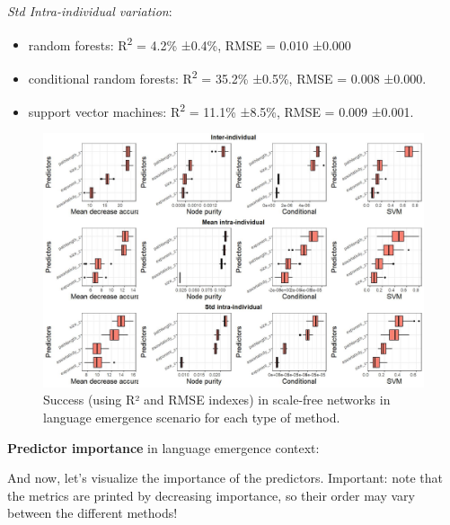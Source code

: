 \documentclass[
]{article}
\providecommand{\tightlist}{%
  \setlength{\itemsep}{0pt}\setlength{\parskip}{0pt}}
\begin{document}
\emph{Std Intra-individual variation}:

\begin{itemize}
\tightlist
\item
  random forests: R\textsuperscript{2} = 4.2\% ±0.4\%, RMSE = 0.010
  ±0.000
\item
  conditional random forests: R\textsuperscript{2} = 35.2\% ±0.5\%, RMSE
  = 0.008 ±0.000.
\item
  support vector machines: R\textsuperscript{2} = 11.1\% ±8.5\%, RMSE =
  0.009 ±0.001.
\end{itemize}

\begin{figure}[!H]

{\centering \includegraphics{./Figures/unnamed-chunk-106-1} 

}

\caption{Success (using R² and RMSE indexes) in scale-free networks in language emergence scenario for each type of method.}\label{fig:unnamed-chunk-106}
\end{figure}

\textbf{Predictor importance} in language emergence context:

And now, let's visualize the importance of the predictors. Important:
note that the metrics are printed by decreasing importance, so their
order may vary between the different methods!
\end{document}
